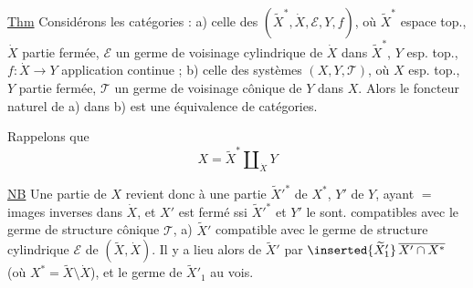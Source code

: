 \uline{Thm} Considérons les  catégories  :
a) celle des 
$(\widetilde X^*,\dot X,\mathcal E,Y,f)$, où
$\widetilde X^*$ espace top., $\dot X$ partie fermée, $\mathcal E$ un germe
de voisinage cylindrique de $\dot X$ dans $\widetilde X^*$,
$Y$ esp. top., $f:\dot X\longrightarrow Y$ application continue ;
b) celle des systèmes $(X,Y,\mathcal T)$, où
$X$ esp. top., $Y$ partie fermée, $\mathcal T$ un germe
de voisinage cônique de $Y$ dans $X$. 
 Alors le foncteur naturel  de a)
dans b) est une équivalence de catégories.


Rappelons que
\[
X=\widetilde X^*\amalg_{\dot X}Y
\]

\uline{NB} Une partie  de $X$ revient donc à une
partie $\widetilde X'^*$ de $X^*$, $Y'$ de $Y$, ayant $=$
images inverses dans $\dot X$, et $X'$ est fermé ssi
$\widetilde X'^*$ et $Y'$ le sont. 
compatibles avec le germe de structure
cônique $\mathcal T$, 
a) $\widetilde X'$ compatible avec le germe de structure
cylindrique $\mathcal E$ de $(\widetilde X,\dot X)$.
Il y a lieu alors de  $\widetilde X'$ par
$\inserted{\widetilde X'_1}\,\overline{X'\cap X^*}$
(où $X^*=\widetilde X\setminus\dot X$), et le germe de $\widetilde X'_1$ au vois.
